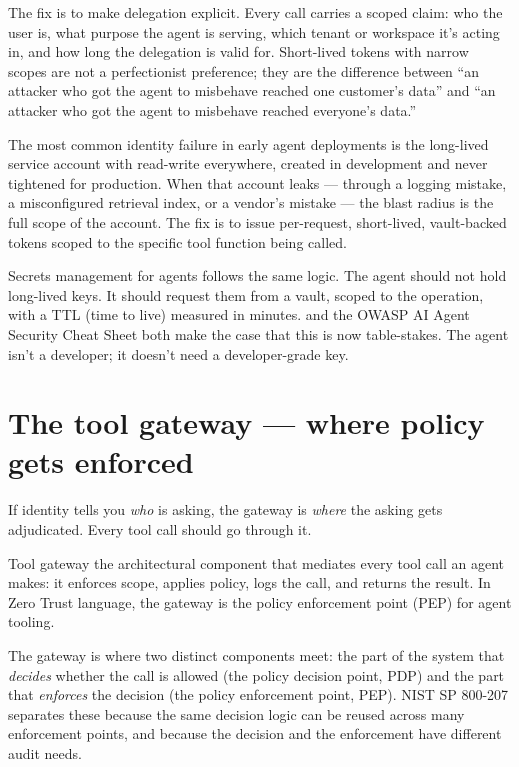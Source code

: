 The fix is to make delegation explicit. Every call carries a scoped claim: who the user is, what purpose the agent is serving, which tenant or workspace it's acting in, and how long the delegation is valid for. Short-lived tokens with narrow scopes are not a perfectionist preference; they are the difference between ``an attacker who got the agent to misbehave reached one customer's data'' and ``an attacker who got the agent to misbehave reached everyone's data.''

\begin{TNwarning}
The most common identity failure in early agent deployments is the long-lived service account with read-write everywhere, created in development and never tightened for production. When that account leaks --- through a logging mistake, a misconfigured retrieval index, or a vendor's mistake --- the blast radius is the full scope of the account. The fix is to issue per-request, short-lived, vault-backed tokens scoped to the specific tool function being called.
\end{TNwarning}

Secrets management for agents follows the same logic. The agent should not hold long-lived keys. It should request them from a vault, scoped to the operation, with a TTL (time to live) measured in minutes. \citet{inan2023llamaguard} and the OWASP AI Agent Security Cheat Sheet both make the case that this is now table-stakes. The agent isn't a developer; it doesn't need a developer-grade key.

\section{The tool gateway --- where policy gets enforced}

If identity tells you \textit{who} is asking, the gateway is \textit{where} the asking gets adjudicated. Every tool call should go through it.

\begin{TNdefinition}{Tool gateway}
the architectural component that mediates every tool call an agent makes: it enforces scope, applies policy, logs the call, and returns the result. In Zero Trust language, the gateway is the policy enforcement point (PEP) for agent tooling.
\end{TNdefinition}

The gateway is where two distinct components meet: the part of the system that \textit{decides} whether the call is allowed (the policy decision point, PDP) and the part that \textit{enforces} the decision (the policy enforcement point, PEP). NIST SP 800-207 separates these because the same decision logic can be reused across many enforcement points, and because the decision and the enforcement have different audit needs.

